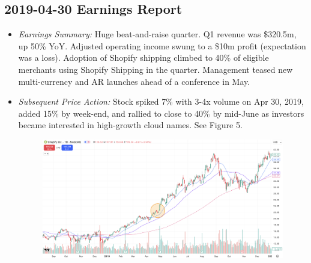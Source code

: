 \documentclass[11pt]{article}
\begin{document}
    \subsection{2019-04-30 Earnings Report} 
        \begin{itemize}
            \item \textit{Earnings Summary:} Huge beat-and-raise quarter. Q1 revenue was \$320.5m, up 50\% YoY. Adjusted operating income swung to a \$10m profit (expectation was a loss). Adoption of Shopify shipping climbed to 40\% of eligible merchants using Shopify Shipping in the quarter. Management teased new multi-currency and AR launches ahead of a conference in May.
            \item \textit{Subsequent Price Action:} Stock spiked 7\% with 3-4x volume on Apr 30, 2019, added 15\% by week-end, and rallied to close to 40\% by mid-June as investors became interested in high-growth cloud names. See Figure 5.
            \begin{figure}[h]
                \centering \includegraphics[width=0.8\linewidth]{images/SHOP1.png}
                \caption{}
            \end{figure}
        \end{itemize}
\end{document}
